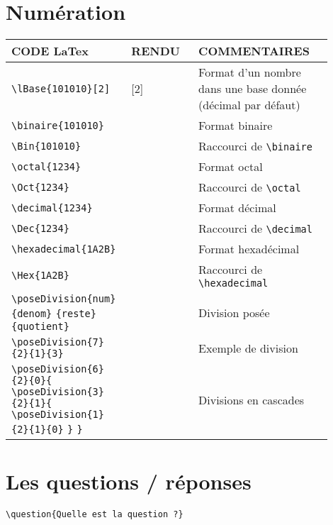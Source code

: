 \documentclass[a4paper,10pt]{article}
\begin{document}
		
	\section{Numération}
	
	
		\begin{tabular}{|m{0.3\linewidth}|m{0.2\linewidth}|m{0.4\linewidth}|}
			\hline
				CODE LaTex			&	RENDU				&	COMMENTAIRES
			\\\hline\hline
				\verb!\lBase{101010}[2]!	&	\lBase{101010}[2]		&	Format d'un nombre dans une base donnée (décimal par défaut)
			\\\hline
				\verb!\binaire{101010}!		&	\binaire{101010}		&	Format binaire
			\\\hline
				\verb!\Bin{101010}!		&	\Bin{101010}		&	Raccourci de \verb!\binaire!
			\\\hline
				\verb!\octal{1234}!		&	\octal{1234}		&	Format octal
			\\\hline
				\verb!\Oct{1234}!		&	\Oct{1234}		&	Raccourci de \verb!\octal!
			\\\hline
				\verb!\decimal{1234}!		&	\decimal{1234}		&	Format décimal
			\\\hline
				\verb!\Dec{1234}!		&	\Dec{1234}		&	Raccourci de \verb!\decimal!
			\\\hline
				\verb!\hexadecimal{1A2B}!	&	\hexadecimal{1A2B}		&	Format hexadécimal
			\\\hline
				\verb!\Hex{1A2B}!		&	\Hex{1A2B}		&	Raccourci de \verb!\hexadecimal!
			\\\hline
				\verb!\poseDivision{num}{denom}! \verb!{reste}{quotient}!	&	\poseDivision{num}{denom}{reste}{quotient}		&	Division posée
			\\\hline
				\verb!\poseDivision{7}{2}{1}{3}!	&	\poseDivision{7}{2}{1}{3}		&	Exemple de division
			\\\hline
				\verb!\poseDivision{6}{2}{0}{! \verb!\poseDivision{3}{2}{1}{! \verb!\poseDivision{1}{2}{1}{0}!  \verb!}! \verb!}!	&	\poseDivision{6}{2}{0}{\poseDivision{3}{2}{1}{\poseDivision{1}{2}{1}{0}}}		&	Divisions en cascades
			\\\hline
		\end{tabular}
		
		
	\section{Les questions / réponses}
	
		\verb!\question{Quelle est la question ?}!
		
\end{document}

